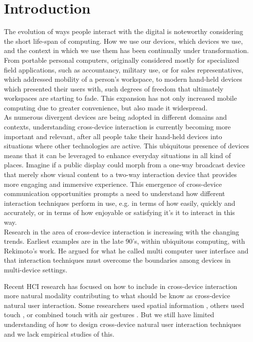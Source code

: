 \section{Introduction} \label{sec:introduction}
The evolution of ways people interact with the digital is noteworthy considering the short life-span of computing. How we use our devices, which devices we use, and the context in which we use them has been continually under transformation. From portable personal computers, originally considered mostly for specialized field applications, such as accountancy, military use, or for sales representatives, which addressed mobility of a person's workspace, to modern hand-held devices which presented their users with, such degrees of freedom that ultimately workspaces are starting to fade. This expansion has not only increased mobile computing due to greater convenience, but also made it widespread.\cite{Francis:1997} \\

As numerous divergent devices are being adopted in different domains and contexts, understanding cross-device interaction is currently becoming more important and relevant, after all people take their hand-held devices into situations where other technologies are active. This ubiquitous presence of devices means that it can be leveraged to enhance everyday situations in all kind of places. Imagine if a public display could morph from a one-way broadcast device that merely show visual content to a two-way interaction device that provides more engaging and immersive experience. This emergence of cross-device communication opportunities prompts a need to understand how different interaction techniques perform in use, e.g. in terms of how easily, quickly and accurately, or in terms of how enjoyable or satisfying it's it to interact in this way. \\

Research in the area of cross-device interaction is increasing with the changing trends. Earliest examples are in the late 90's, within ubiquitous computing, with Rekimoto's work.  He argued for what he called multi computer user interface and that interaction techniques must overcome the boundaries among devices in multi-device settings\cite{Rekimoto:1998}.

Recent HCI research has focused on how to include in cross-device interaction more natural modality contributing to what should be know as cross-device natural user interaction.  Some researchers used spatial information \cite{Marquardt:2011, Marquardt:2012}, others used touch \cite{Seifert:2012}, or combined touch with air gestures \cite{Bragdon:2011} . But we still have limited understanding of how to design cross-device natural user interaction techniques and we lack empirical studies of this.\\

